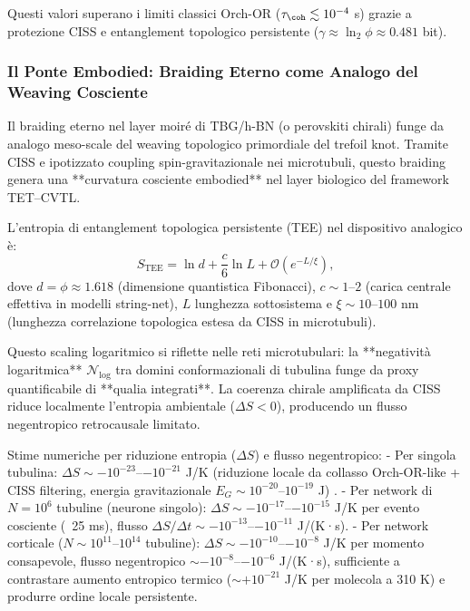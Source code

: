 \documentclass[11pt,a4paper]{article}
\let\oldcite\cite
\renewcommand{\cite}{\protect\oldcite}
\theoremstyle{plain}
\theoremstyle{definition}
\begin{document}
Questi valori superano i limiti classici Orch-OR ($\tau_{\coh} \lesssim 10^{-4}$ s) grazie a protezione CISS e entanglement topologico persistente ($\gamma \approx \ln_2 \phi \approx 0.481$ bit).

\subsubsection{Il Ponte Embodied: Braiding Eterno come Analogo del Weaving Cosciente}

Il braiding eterno nel layer moiré di TBG/h-BN (o perovskiti chirali) funge da analogo meso-scale del weaving topologico primordiale del trefoil knot. Tramite CISS e ipotizzato coupling spin-gravitazionale nei microtubuli, questo braiding genera una **curvatura cosciente embodied** nel layer biologico del framework TET--CVTL.

L'entropia di entanglement topologica persistente (TEE) nel dispositivo analogico è:
\begin{equation}
S_{\text{TEE}} = \ln d + \frac{c}{6} \ln L + \mathcal{O}(e^{-L/\xi}),
\label{eq:tee_persistent}
\end{equation}
dove $d = \phi \approx 1.618$ (dimensione quantistica Fibonacci), $c \sim 1$--$2$ (carica centrale effettiva in modelli string-net), $L$ lunghezza sottosistema e $\xi \sim 10$--$100$ nm (lunghezza correlazione topologica estesa da CISS in microtubuli).

Questo scaling logaritmico si riflette nelle reti microtubulari: la **negatività logaritmica** $\mathcal{N}_{\log}$ tra domini conformazionali di tubulina funge da proxy quantificabile di **qualia integrati**. La coerenza chirale amplificata da CISS riduce localmente l'entropia ambientale ($\Delta S < 0$), producendo un flusso negentropico retrocausale limitato.

Stime numeriche per riduzione entropia ($\Delta S$) e flusso negentropico:
- Per singola tubulina: $\Delta S \sim -10^{-23}$--$-10^{-21}$ J/K (riduzione locale da collasso Orch-OR-like + CISS filtering, energia gravitazionale $E_G \sim 10^{-20}$--$10^{-19}$ J) \cite{hameroff2025orch}.
- Per network di $N = 10^6$ tubuline (neurone singolo): $\Delta S \sim -10^{-17}$--$-10^{-15}$ J/K per evento cosciente (~25 ms), flusso $\Delta S / \Delta t \sim -10^{-13}$--$-10^{-11}$ J/(K·s).
- Per network corticale ($N \sim 10^{11}$--$10^{14}$ tubuline): $\Delta S \sim -10^{-10}$--$-10^{-8}$ J/K per momento consapevole, flusso negentropico $\sim -10^{-8}$--$-10^{-6}$ J/(K·s), sufficiente a contrastare aumento entropico termico ($\sim +10^{-21}$ J/K per molecola a 310 K) e produrre ordine locale persistente.
\end{document}
